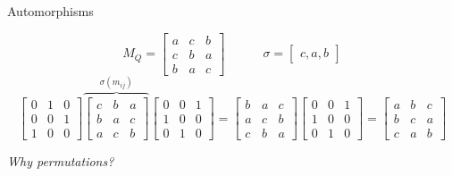\begin{frame}{Automorphisms}

\[M_Q=\begin{bmatrix}
a& c & b \\
c & b & a\\
b & a& c
\end{bmatrix} \hspace{3em}\sigma = \begin{bmatrix}
c, a, b
\end{bmatrix}\]\vspace{1em}
\[\begin{bmatrix}
0& 1 & 0 \\
0 & 0 & 1\\
1 & 0& 0
\end{bmatrix} \overbrace{\begin{bmatrix}
c& b & a \\
b & a & c\\
a & c& b
\end{bmatrix}}^{\sigma(m_{ij})} \begin{bmatrix}
0& 0 & 1 \\
1 & 0 & 0\\
0 & 1& 0
\end{bmatrix} =\begin{bmatrix}
b & a & c \\
a & c & b\\
c & b & a
\end{bmatrix}  \begin{bmatrix}
0& 0 & 1 \\
1 & 0 & 0\\
0 & 1& 0
\end{bmatrix}=\begin{bmatrix}
a& b & c \\
b & c & a\\
c & a& b
\end{bmatrix}\]\vspace{1em}
\begin{center}
    \emph{Why permutations?}
\end{center}

\end{frame}

